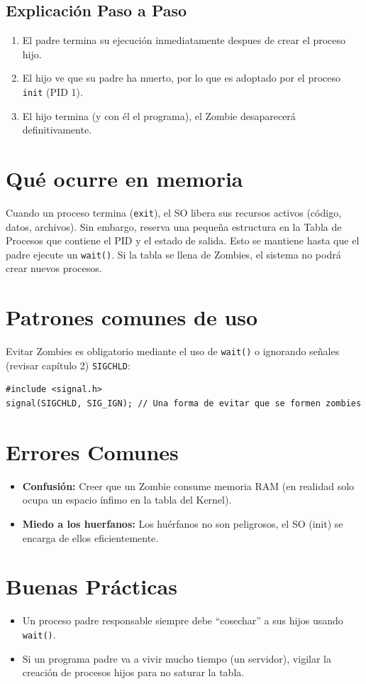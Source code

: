 \documentclass[12pt,a4paper]{article}
\begin{document}
\subsection{Explicación Paso a Paso}
\begin{enumerate}
    \item El padre termina su ejecución inmediatamente despues de crear el proceso hijo.
    \item El hijo ve que su padre ha muerto, por lo que es adoptado por el proceso \texttt{init} (PID 1).
    \item El hijo termina (y con él el programa), el Zombie desaparecerá definitivamente.
\end{enumerate}

\section{Qué ocurre en memoria}
Cuando un proceso termina (\texttt{exit}), el SO libera sus recursos activos (código, datos, archivos). Sin embargo, reserva una pequeña estructura en la Tabla de Procesos que contiene el PID y el estado de salida. Esto se mantiene hasta que el padre ejecute un \texttt{wait()}. Si la tabla se llena de Zombies, el sistema no podrá crear nuevos procesos.

\section{Patrones comunes de uso}
Evitar Zombies es obligatorio mediante el uso de \texttt{wait()} o ignorando señales (revisar capítulo 2) \texttt{SIGCHLD}:
\begin{lstlisting}
#include <signal.h>
signal(SIGCHLD, SIG_IGN); // Una forma de evitar que se formen zombies
\end{lstlisting}

\section{Errores Comunes}
\begin{itemize}
    \item \textbf{Confusión:} Creer que un Zombie consume memoria RAM (en realidad solo ocupa un espacio ínfimo en la tabla del Kernel).
    \item \textbf{Miedo a los huerfanos:} Los huérfanos no son peligrosos, el SO (init) se encarga de ellos eficientemente.
\end{itemize}

\section{Buenas Prácticas}
\begin{itemize}
    \item Un proceso padre responsable siempre debe ``cosechar'' a sus hijos usando \texttt{wait()}.
    \item Si un programa padre va a vivir mucho tiempo (un servidor), vigilar la creación de procesos hijos para no saturar la tabla.
\end{itemize}
\end{document}
